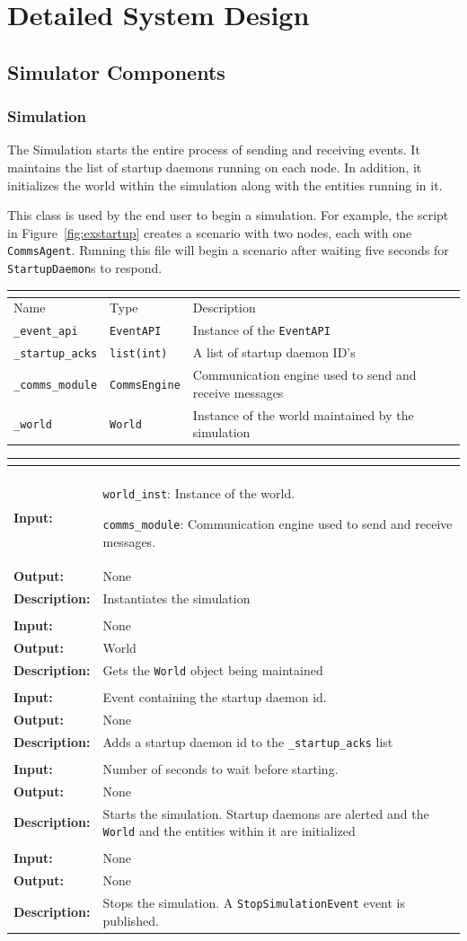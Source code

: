 \documentclass[titlepage]{article}
\renewenvironment{itemize*}
    {\begin{itemize}
        \setlength{\itemsep}{0pt}%
        \setlength{\parskip}{0pt}%
        \setlength{\partopsep}{0pt}%
        \setlength{\topsep}{0pt}}%
    {\end{itemize}}
\newcommand{\operations}[1]{
\begin{center}
    \begin{longtable}{|p{4cm}|p{10cm + 2.0\tabcolsep}|}
    \hline
    \multicolumn{2}{|l|}{\cellcolor[gray]{0.5}{\textbf{Operations}}} \\ \hline
#1
    \end{longtable}
\end{center}
}
\newcommand{\operation}[4]{
    \hline
    \multicolumn{2}{|l|}{\cellcolor[gray]{0.8}{\texttt{#1}}} \\ \hline
    \hspace{7pt}\textbf{Input:} & #2 \\ \hline
    \hspace{7pt}\textbf{Output:} & #3 \\ \hline
    \hspace{7pt}\textbf{Description:} & #4 \\ \hline
}
\newcommand{\attributes}[1]{
    \begin{center}
        \begin{tabular}{|p{3.5cm}|p{3.5cm}|p{7cm}|}
            \multicolumn{3}{|l|}{\cellcolor[gray]{0.5}{\textbf{Attributes}}} \\ \hline
            \rowcolor[gray]{0.8} Name & Type & Description \\ \hline 
            #1
        \end{tabular}
    \end{center}
}
\newcommand{\attribute}[3]{
    \texttt{#1} & \texttt{#2} & #3 \\ \hline
}
\begin{document}
\section{Detailed System Design}

\subsection{Simulator Components}
\subsubsection{Simulation}
{The Simulation starts the entire process of sending and receiving events.  It maintains the list of startup daemons running on each node. In addition, it initializes the world within the simulation along with the entities running in it.

This class is used by the end user to begin a simulation.  For example, the script in Figure~\ref{fig:exstartup} creates
a scenario with two nodes, each with one \texttt{CommsAgent}.  Running this file will begin a scenario after waiting five seconds for \texttt{StartupDaemon}s to respond.
}

\attributes{
    \attribute{\_event\_api}{EventAPI}{Instance of the \texttt{EventAPI}}
    \attribute{\_startup\_acks}{list(int)}{A list of startup daemon ID's}
    \attribute{\_comms\_module}{CommsEngine}{Communication engine used to send and receive messages}
    \attribute{\_world}{World}{Instance of the world maintained by the simulation}
}

\operations{
    \operation{\_\_init\_\_(world\_inst, comms\_module)}
    {
        \begin{itemize*}
            \item \texttt{world\_inst}: Instance of the world. 
            \item \texttt{comms\_module}: Communication engine used to send and receive messages.
        \end{itemize*}
    }{None}{Instantiates the simulation}
    \operation{get\_world()}{None}{World}{Gets the \texttt{World} object being maintained}
    \operation{get\_on\_ack\_startup(event)}{Event containing the startup daemon id.}{None}{Adds a startup daemon id to the \texttt{\_startup\_acks} list}
    \operation{start(wait)}{Number of seconds to wait before starting.}{None}{Starts the simulation. Startup daemons are alerted and the \texttt{World} and the entities within it are initialized}
    \operation{stop()}{None}{None}{Stops the simulation. A \texttt{StopSimulationEvent} event is published.}
}
\end{document}
